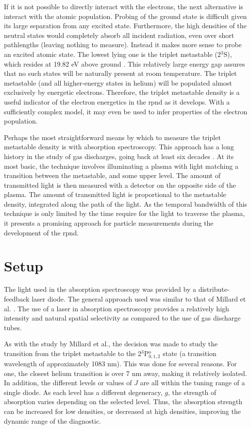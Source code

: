 If it is not possible to directly interact with the electrons, the next
alternative is interact with the atomic population. Probing of the ground state
is difficult given its large separation from any excited state. Furthermore, the
high densities of the neutral states would completely absorb all incident
radiation, even over short pathlengths (leaving nothing to measure). Instead it
makes more sense to probe an excited atomic state. The lowest lying one is the
triplet metastable (2$^3$S), which resides at 19.82 eV above ground
\cite{Kramida2012}. This relatively large energy gap assures that no such states
will be naturally present at room temperature. The triplet metastable (and all
higher-energy states in helium) will be populated almost exclusively by
energetic electrons. Therefore, the triplet metastable density is a useful
indicator of the electron energetics in the \acs{rpnd} as it develops. With a
sufficiently complex model, it may even be used to infer properties of the
electron population.

Perhaps the most straightforward means by which to measure the triplet
metastable density is with absorption spectroscopy. This approach has a long
history in the study of gas discharges, going back at least six decades
\cite{Phelps1953}. At its most basic, the technique involves illuminating a
plasma with light matching a transition between the metastable, and some upper
level. The amount of transmitted light is then measured with a detector on the
opposite side of the plasma. The amount of transmitted light is proportional to
the metastable density, integrated along the path of the light. As the temporal
bandwidth of this technique is only limited by the time require for the light to
traverse the plasma, it presents a promising approach for particle measurements
during the development of the \acs{rpnd}.

\section{Setup}

The light used in the absorption spectroscopy was provided by a
distribute-feedback laser diode. The general approach used was similar to that
of Millard et al. \cite{Millard1998}. The use of a laser in absorption
spectroscopy provides a relatively high intensity and natural spatial
selectivity as compared to the use of gas discharge tubes.

As with the study by Millard et al., the decision was made to study the
transition from the triplet metastable to the 2$^3$P$^\mathrm{o}_{0,1,2}$ state
(a transition wavelength of approximately 1083 nm). This was done for several
reasons. For one, the closest helium transition is over 7 nm away, making it
relatively isolated. In addition, the different levels or values of $J$ are all
within the tuning range of a single diode. As each level has a different
degeneracy, $g$, the strength of absorption varies depending on the selected
level. Thus, the absorption strength can be increased for low densities, or
decreased at high densities, improving the dynamic range of the diagnostic.

